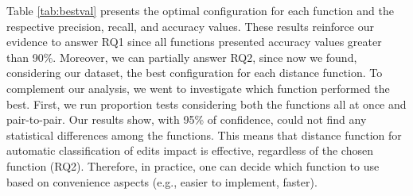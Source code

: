Table \ref{tab:bestval} presents the optimal configuration for each function and the respective precision, recall, and accuracy values. These results reinforce our evidence to answer RQ1 since all functions presented accuracy values greater than 90\%. Moreover, we can partially answer RQ2, since now we found, considering our dataset, the best configuration for each distance function. To complement our analysis, we went to investigate which function performed the best. First, we run proportion tests considering both the functions all at once and pair-to-pair. Our results show, with 95\% of confidence, could not find any statistical differences among the functions. This means that distance function for automatic classification of edits impact is effective, regardless of the chosen function (RQ2). Therefore, in practice, one can decide which function to use based on convenience aspects (e.g., easier to implement, faster). 

\\
\\
\noindent
\vspace{2mm} %

